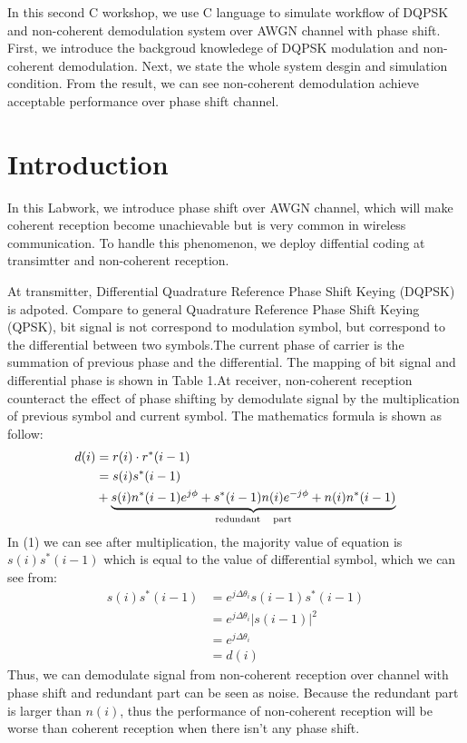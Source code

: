 \documentclass[technicalreport]{ieicej}
\begin{document}
\begin{eabstract}
In this second C workshop, we use C language to simulate workflow of DQPSK and non-coherent demodulation system over AWGN channel with phase shift. First, we introduce the backgroud knowledege of DQPSK modulation and non-coherent demodulation. Next, we state the whole system desgin and simulation condition. From the result, we can see non-coherent demodulation achieve acceptable performance over phase shift channel.
\end{eabstract}

\maketitle

\section{Introduction}
In this Labwork, we introduce phase shift over AWGN channel, which will make coherent reception become unachievable but is very common in wireless communication. To handle this phenomenon, we deploy diffential coding at transimtter and non-coherent reception.\par
At transmitter, Differential Quadrature Reference Phase Shift Keying (DQPSK) is adpoted. Compare to general Quadrature Reference Phase Shift Keying (QPSK), bit signal is not correspond to modulation symbol, but correspond to the differential between two symbols.The current phase of carrier is the summation of previous phase and the differential. The mapping of bit signal and differential phase is shown in Table 1.At receiver, non-coherent reception counteract the effect of phase shifting by demodulate signal by the multiplication of previous symbol and current symbol. The mathematics formula is shown as follow:
\begin{equation}
\begin{aligned}
d(i)&=r(i)\cdot r^*(i-1)\\
&=s(i)s^*(i-1)\\
&+\underbrace{s(i)n^*(i-1)e^{j\phi}+s^*(i-1)n(i)e^{-j\phi}+n(i)n^*(i-1)}_{\rm redundant\quad part}
\end{aligned}
\end{equation}
In (1) we can see after multiplication, the majority value of equation is $s(i)s^*(i-1)$ which is equal to the value of differential symbol, which we can see from:
\begin{equation}
\begin{aligned}
s(i)s^*(i-1)&=e^{j\Delta\theta_i}s(i-1)s^*(i-1)\\
&=e^{j\Delta\theta_i}|s(i-1)|^2\\
&=e^{j\Delta\theta_i}\\
&=d(i)
\end{aligned}
\end{equation}
Thus, we can demodulate signal from non-coherent reception over channel with phase shift and redundant part can be seen as noise\cite{486610}. Because the redundant part is larger than $n(i)$, thus the performance of non-coherent reception will be worse than coherent reception when there isn't any phase shift.
\end{document}
